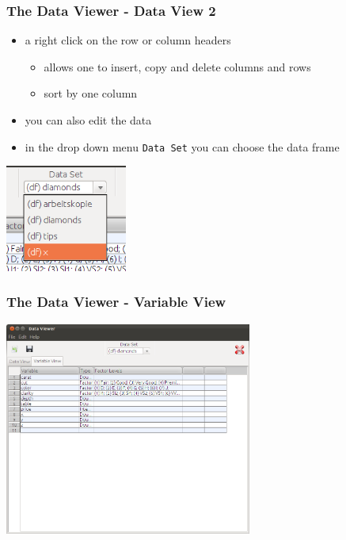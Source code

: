 \documentclass[xcolor={table}]{beamer}
\begin{document}
\begin{frame}\frametitle{The Data Viewer - Data View 2}
  \begin{itemize}
  \item a right click on the row or column headers 
    \begin{itemize}
    \item allows one to insert, copy and delete columns and rows 
    \item sort by one column
    \end{itemize}
  \item you can also edit the data
  \item in the drop down menu \texttt{Data Set} you can choose the data frame
  \end{itemize}
  \begin{center}
  \includegraphics[width=4cm]{dataviewer4.png}
\end{center}
\end{frame}

\begin{frame}\frametitle{The Data Viewer - Variable View}
  \begin{center}
    \includegraphics[height=7cm]{dataviewer3.png}
  \end{center}
\end{frame}
\end{document}

